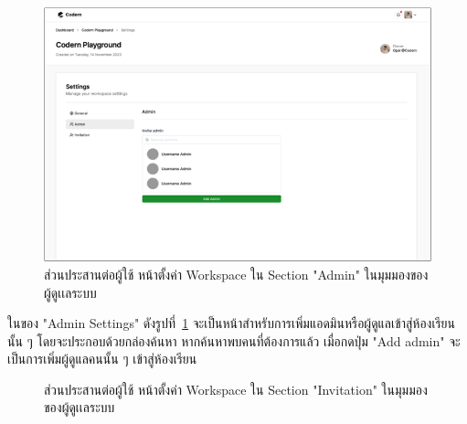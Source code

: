 \documentclass[12pt,one side,openright,a4paper]{cpe-thesis-th}
\newcommand{\thaijustify}[1]{%
  \par\hspace{30pt}\justifying
  #1
}
\begin{document}
                \hypertarget{new-ui-setting-admin}{
                    \begin{figure}[H]
                    \centering
                        \includegraphics[width=15cm]{figure/new-ui/ui-setting-admin.png}
                        \caption[ส่วนประสานต่อผู้ใช้ หน้าตั้งค่า Workspace ของผู้ดูเเลระบบ (ใน "Admin")]{ส่วนประสานต่อผู้ใช้ หน้าตั้งค่า Workspace ใน Section "Admin" ในมุมมองของผู้ดูเเลระบบ}
                        \label{fig:new-ui-setting-admin}
                    \end{figure}
                }
                
                \thaijustify{
                ในของ "Admin Settings" ดังรูปที่~\ref{fig:new-ui-setting-admin} จะเป็นหน้าสำหรับการเพิ่มแอดมินหรือผู้ดูแลเข้าสู่ห้องเรียนนั้น ๆ โดยจะประกอบด้วยกล่องค้นหา หากค้นหาพบคนที่ต้องการแล้ว เมื่อกดปุ่ม "Add admin" จะเป็นการเพิ่มผู้ดูแลคนนั้น ๆ เข้าสู่ห้องเรียน
                }
                
                \hypertarget{new-ui-setting-invitation1}{
                    \begin{figure}[H]
                    \centering
                        \caption[ส่วนประสานต่อผู้ใช้ หน้าตั้งค่า Workspace ของผู้ดูเเลระบบ (ใน "Invitation")]{ส่วนประสานต่อผู้ใช้ หน้าตั้งค่า Workspace ใน Section "Invitation" ในมุมมองของผู้ดูเเลระบบ}
                        \label{fig:new-ui-setting-invitation1}
                    \end{figure}
                }
                
\end{document}

